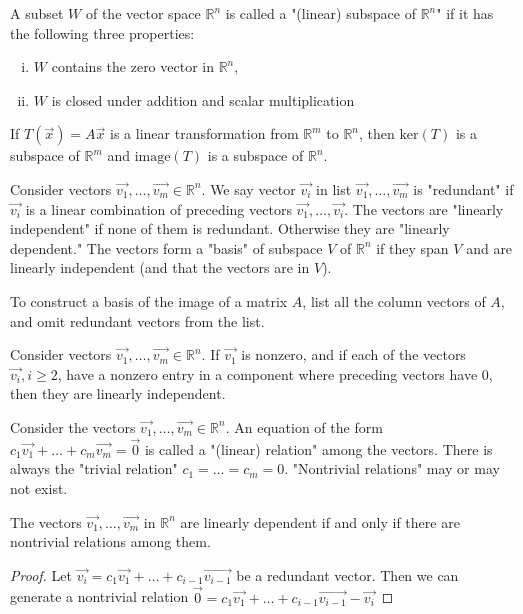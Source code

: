 \documentclass[a4paper,11pt]{article}
\begin{document}
\begin{outline}
    A subset \(W\) of the vector space \(\mathbb{R}^n\) is called a "(linear) subspace of \(\mathbb{R}^n\)" if it
    has the following three properties:
    \begin{enumerate}[i.]
      \item \(W\) contains the zero vector in \(\mathbb{R}^n\),
      \item \(W\) is closed under addition and scalar multiplication
    \end{enumerate}
    
    If \(T(\vec{x}) = A\vec{x}\) is a linear transformation from \(\mathbb{R}^m\) to \(\mathbb{R}^n\), then
    \(\text{ker}(T)\) is a subspace of \(\mathbb{R}^m\) and \(\text{image}(T)\) is a subspace of \(\mathbb{R}^n\).
    
    Consider vectors \(\vec{v_1}, \ldots, \vec{v_m} \in \mathbb{R}^n\). We say vector \(\vec{v_i}\) in list
    \(\vec{v_1}, \ldots, \vec{v_m}\) is "redundant" if \(\vec{v_i}\) is a linear combination of preceding
    vectors \(\vec{v_1}, \ldots, \vec{v_i}\). The vectors are "linearly independent" if none of them is
    redundant. Otherwise they are "linearly dependent." The vectors form a "basis" of subspace \(V\) of 
    \(\mathbb{R}^n\) if they span \(V\) and are linearly independent (and that the vectors are in \(V\)).
    
    To construct a basis of the image of a matrix \(A\), list all the column vectors of \(A\), and omit redundant
    vectors from the list.
    
    Consider vectors \(\vec{v_1}, \ldots, \vec{v_m} \in \mathbb{R}^n\). If \(\vec{v_1}\) is nonzero, and if each
    of the vectors \(\vec{v_i}, i \geq 2\), have a nonzero entry in a component where preceding vectors have \(0\),
    then they are linearly independent.
    
    Consider the vectors \(\vec{v_1}, \ldots, \vec{v_m} \in \mathbb{R}^n\). An equation of the form \(c_1\vec{v_1} +
    \ldots + c_m\vec{v_m} = \vec{0}\) is called a "(linear) relation" among the vectors. There is always the "trivial
    relation" \(c_1 = \ldots = c_m = 0\). "Nontrivial relations" may or may not exist.
    
    The vectors \(\vec{v_1}, \ldots, \vec{v_m}\) in \(\mathbb{R}^n\) are linearly dependent if and only if there
    are nontrivial relations among them.
    
    \begin{proof}
      \forward
        Let \(\vec{v_i} = c_1\vec{v_1} + \ldots + c_{i-1}\vec{v_{i-1}}\) be a redundant vector. Then we can
        generate a nontrivial relation \(\vec{0} = c_1\vec{v_1} + \ldots + c_{i-1}\vec{v_{i-1}} - \vec{v_i}\)
        

\end{proof}
\end{outline}
\end{document}
